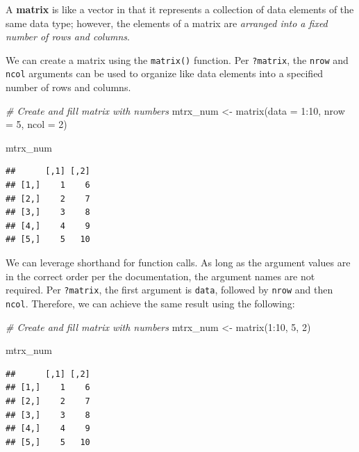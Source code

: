 \documentclass[
]{book}
\newenvironment{Shaded}{\begin{snugshade}}{\end{snugshade}}
\newcommand{\AttributeTok}[1]{\textcolor[rgb]{0.77,0.63,0.00}{#1}}
\newcommand{\CommentTok}[1]{\textcolor[rgb]{0.56,0.35,0.01}{\textit{#1}}}
\newcommand{\DecValTok}[1]{\textcolor[rgb]{0.00,0.00,0.81}{#1}}
\newcommand{\FunctionTok}[1]{\textcolor[rgb]{0.00,0.00,0.00}{#1}}
\newcommand{\NormalTok}[1]{#1}
\newcommand{\OtherTok}[1]{\textcolor[rgb]{0.56,0.35,0.01}{#1}}
\newcommand{\SpecialCharTok}[1]{\textcolor[rgb]{0.00,0.00,0.00}{#1}}
\begin{document}
A \textbf{matrix} is like a vector in that it represents a collection of data elements of the same data type; however, the elements of a matrix are \emph{arranged into a fixed number of rows and columns}.

We can create a matrix using the \texttt{matrix()} function. Per \texttt{?matrix}, the \texttt{nrow} and \texttt{ncol} arguments can be used to organize like data elements into a specified number of rows and columns.

\begin{Shaded}
\begin{Highlighting}[]
\CommentTok{\# Create and fill matrix with numbers}
\NormalTok{mtrx\_num }\OtherTok{\textless{}{-}} \FunctionTok{matrix}\NormalTok{(}\AttributeTok{data =} \DecValTok{1}\SpecialCharTok{:}\DecValTok{10}\NormalTok{, }\AttributeTok{nrow =} \DecValTok{5}\NormalTok{, }\AttributeTok{ncol =} \DecValTok{2}\NormalTok{)}

\NormalTok{mtrx\_num}
\end{Highlighting}
\end{Shaded}

\begin{verbatim}
##      [,1] [,2]
## [1,]    1    6
## [2,]    2    7
## [3,]    3    8
## [4,]    4    9
## [5,]    5   10
\end{verbatim}

We can leverage shorthand for function calls. As long as the argument values are in the correct order per the documentation, the argument names are not required. Per \texttt{?matrix}, the first argument is \texttt{data}, followed by \texttt{nrow} and then \texttt{ncol}. Therefore, we can achieve the same result using the following:

\begin{Shaded}
\begin{Highlighting}[]
\CommentTok{\# Create and fill matrix with numbers}
\NormalTok{mtrx\_num }\OtherTok{\textless{}{-}} \FunctionTok{matrix}\NormalTok{(}\DecValTok{1}\SpecialCharTok{:}\DecValTok{10}\NormalTok{, }\DecValTok{5}\NormalTok{, }\DecValTok{2}\NormalTok{)}

\NormalTok{mtrx\_num}
\end{Highlighting}
\end{Shaded}

\begin{verbatim}
##      [,1] [,2]
## [1,]    1    6
## [2,]    2    7
## [3,]    3    8
## [4,]    4    9
## [5,]    5   10
\end{verbatim}
\end{document}

